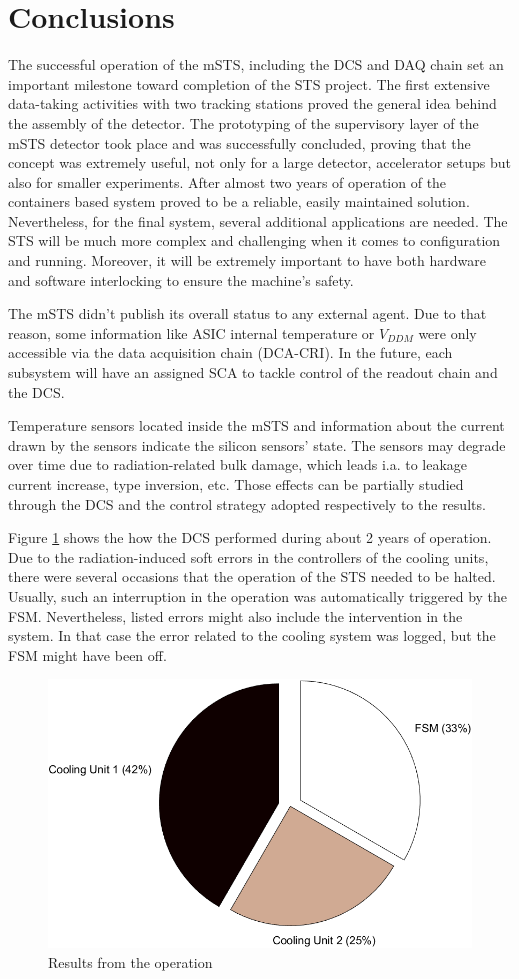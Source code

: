 \section{Conclusions}

The successful operation of the \gls{mSTS}, including the \gls{DCS} and \gls{DAQ} chain set an important milestone toward completion of the \gls{STS} project. The first extensive data-taking activities with two tracking stations proved the general idea behind the assembly of the detector. The prototyping of the supervisory layer of the \gls{mSTS} detector took place and was successfully concluded, proving that the concept was extremely useful, not only for a large detector, accelerator setups but also for smaller experiments. After almost two years of operation of the containers based system proved to be a reliable, easily maintained solution. Nevertheless, for the final system, several additional applications are needed. The \gls{STS} will be much more complex and challenging when it comes to configuration and running. Moreover, it will be extremely important to have both hardware and software interlocking to ensure the machine's safety.

The \gls{mSTS} didn't publish its overall status to any external agent. Due to that reason, some information like \gls{ASIC} internal temperature or $V_{DDM}$ were only accessible via the data acquisition chain (\gls{DCA}-\gls{CRI}). In the future, each subsystem will have an assigned \gls{SCA} to tackle control of the readout chain and the \gls{DCS}. 


Temperature sensors located inside the \gls{mSTS} and information about the current drawn by the sensors indicate the silicon sensors' state. The sensors may degrade over time due to radiation-related bulk damage,  which leads i.a. to leakage current increase, type inversion, etc. Those effects can be partially studied through the \gls{DCS} and the control strategy adopted respectively to the results.

Figure \ref{fig_dcs_results} shows the how the \gls{DCS} performed during about 2 years of operation. Due to the radiation-induced soft errors in the controllers of the cooling units, there were several occasions that the operation of the \gls{STS} needed to be halted. Usually, such an interruption in the operation was automatically triggered by the \gls{FSM}. Nevertheless, listed errors might also include the intervention in the system. In that case the error related to the cooling system was logged, but the FSM might have been off.
\begin{figure}[!h]
\centering
\includegraphics[width=0.55\columnwidth]{Chapter5/DCS/images/DCSpie.png}
\caption{Results from the operation}
\label{fig_dcs_results}
\end{figure}
